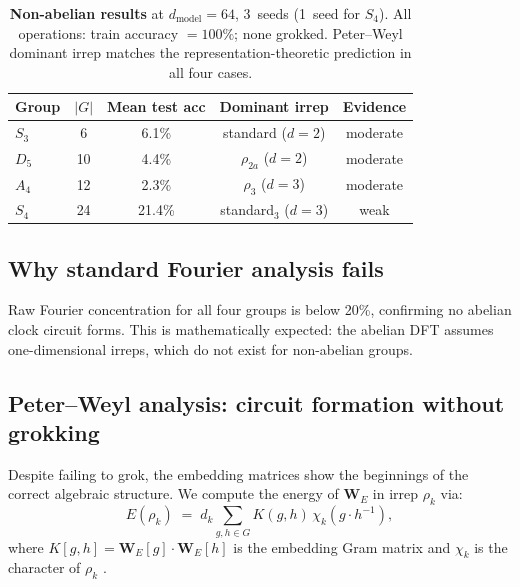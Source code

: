 \documentclass[11pt]{article}
\newcommand{\W}[1]{\mathbf{W}_{#1}}
\begin{document}
\begin{table}[t]
  \centering
  \small
  \caption{\textbf{Non-abelian results} at $d_{\text{model}}=64$,
           3~seeds (1~seed for $S_4$).
           All operations: train accuracy $= 100\%$; none grokked.
           Peter--Weyl dominant irrep matches the representation-theoretic
           prediction in all four cases.}
  \label{tab:nonabelian}
  \renewcommand{\arraystretch}{1.25}
  \begin{tabular}{@{}lcccc@{}}
    \toprule
    \textbf{Group} & $|G|$ & \textbf{Mean test acc} &
    \textbf{Dominant irrep} & \textbf{Evidence} \\
    \midrule
    $S_3$ &  6 &  6.1\% & standard ($d=2$)     & moderate \\
    $D_5$ & 10 &  4.4\% & $\rho_{2a}$ ($d=2$)  & moderate \\
    $A_4$ & 12 &  2.3\% & $\rho_3$ ($d=3$)     & moderate \\
    $S_4$ & 24 & 21.4\% & standard$_3$ ($d=3$) & weak     \\
    \bottomrule
  \end{tabular}
\end{table}

\subsection{Why standard Fourier analysis fails}

Raw Fourier concentration for all four groups is below 20\%, confirming
no abelian clock circuit forms. This is mathematically expected: the
abelian DFT assumes one-dimensional irreps, which do not exist for
non-abelian groups.

\subsection{Peter--Weyl analysis: circuit formation without grokking}
\label{sec:peterwyl}

Despite failing to grok, the embedding matrices show the beginnings of
the correct algebraic structure. We compute the energy of $\W{E}$ in
irrep $\rho_k$ via:
\begin{equation}
  E(\rho_k)
  \;=\; d_k \sum_{g,h\in G} K(g,h)\,\chi_k\!\left(g\cdot h^{-1}\right),
  \label{eq:peterwyl}
\end{equation}
where $K[g,h] = \W{E}[g] \cdot \W{E}[h]$ is the embedding Gram matrix
and $\chi_k$ is the character of $\rho_k$
\citep{diaconis1988group,serre1977linear}.
\end{document}
